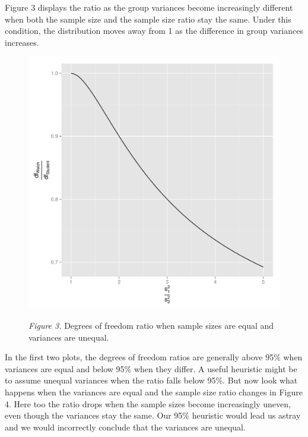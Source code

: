\documentclass[man,a4paper,noextraspace,apacite]{apa6}\usepackage[]{graphicx}\usepackage[]{color}
\makeatletter
\def\maxwidth{ %
  \ifdim\Gin@nat@width>\linewidth
    \linewidth
  \else
    \Gin@nat@width
  \fi
}
\newenvironment{knitrout}{}{} %
\makeatother
\begin{document}
    Figure 3 displays the ratio as the group variances become increasingly different when both the sample size and the sample size ratio stay the same. Under this condition, the distribution moves away from 1 as the difference in group variances increases.

\begin{figure}
\begin{knitrout}
\color{fgcolor}
\includegraphics[width=\maxwidth]{figure/dfratiosDiffvars} 

\end{knitrout}
\textit{Figure 3.} Degrees of freedom ratio when sample sizes are equal and variances are unequal.
\end{figure}

    In the first two plots, the degrees of freedom ratios are generally above 95\% when variances are equal and below 95\% when they differ. A useful heuristic might be to assume unequal variances when the ratio falls below 95\%. But now look what happens when the variances are equal and the sample size ratio changes in Figure 4. Here too the ratio drops when the sample sizes become increasingly uneven, even though the variances stay the same. Our 95\% heuristic would lead us astray and we would incorrectly conclude that the variances are unequal.
\end{document}
